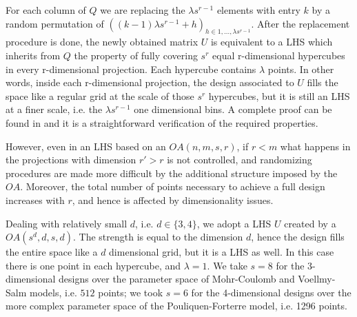 \documentclass{article}
\begin{document}
For each column of $Q$ we are replacing the $\lambda s^{r-1}$ elements with entry $k$ by a random permutation of $\left((k-1)\lambda s^{r-1} + h\right)_{h\in 1,\dots, \lambda s^{r-1}}$. After the replacement procedure is done, the newly obtained matrix $U$ is equivalent to a LHS which inherits from $Q$ the property of fully covering $s^r$ equal r-dimensional hypercubes in every r-dimensional projection. Each hypercube contains $\lambda$ points. In other words, inside each r-dimensional projection, the design associated to $U$ fills the space like a regular grid at the scale of those $s^r$ hypercubes, but it is still an LHS at a finer scale, i.e. the $\lambda s^{r-1}$ one dimensional bins. A complete proof can be found in \cite{Tang1993} and it is a straightforward verification of the required properties.

However, even in an LHS based on an $OA(n,m,s,r)$, if $r<m$ what happens in the projections with dimension $r'>r$ is not controlled, and randomizing procedures are made more difficult by the additional structure imposed by the $OA$. Moreover, the total number of points necessary to achieve a full design increases with $r$, and hence is affected by dimensionality issues.

Dealing with relatively small $d$, i.e. $d\in\{3,4\}$, we adopt a LHS $U$ created by a $OA(s^d,d,s,d)$. The strength is equal to the dimension $d$, hence the design fills the entire space like a $d$ dimensional grid, but it is a LHS as well. In this case there is one point in each hypercube, and $\lambda=1$. We take $s=8$ for the 3-dimensional designs over the parameter space of Mohr-Coulomb and Voellmy-Salm models, i.e. $512$ points; we took $s=6$ for the 4-dimensional designs over the more complex parameter space of the Pouliquen-Forterre model, i.e. 1296 points.

\newpage


\end{document}
